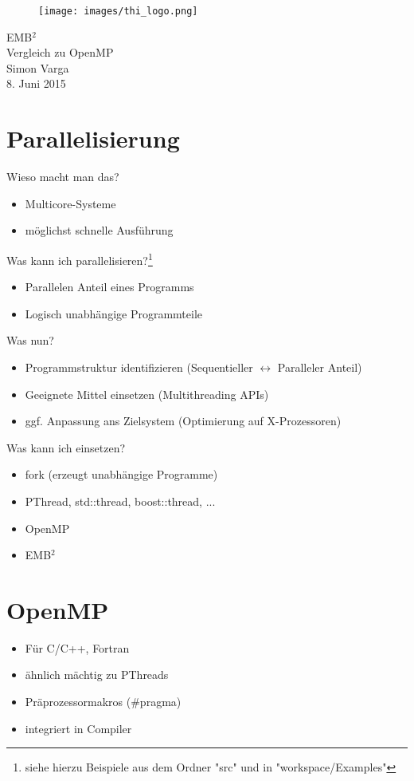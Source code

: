 \documentclass[a4paper,11pt,DIV=11]{article} %
\begin{document}
\begin{titlepage}
	\begin{figure}[h!]
	\centering
		\texttt{[image: images/thi\_logo.png]}
	\end{figure}
	
	\begin{center}
		\LARGE EMB$ ^2$\\ \large Vergleich zu OpenMP \\
		\vspace{1cm}
		\normalsize Simon Varga\\
		\normalsize 8. Juni 2015
	\end{center}
\end{titlepage}


\section{Parallelisierung}
Wieso macht man das?
\begin{itemize}
	\item Multicore-Systeme
	\item möglichst schnelle Ausführung
\end{itemize}
Was kann ich parallelisieren?\footnote{siehe hierzu Beispiele aus dem Ordner "src" und in "workspace/Examples"}
\begin{itemize}
	\item Parallelen Anteil eines Programms
	\item Logisch unabhängige Programmteile
\end{itemize}
Was nun?
\begin{itemize}
	\item Programmstruktur identifizieren (Sequentieller $\leftrightarrow$ Paralleler Anteil)
	\item Geeignete Mittel einsetzen (Multithreading APIs)
	\item ggf. Anpassung ans Zielsystem (Optimierung auf X-Prozessoren)
\end{itemize}
Was kann ich einsetzen?
\begin{itemize}
	\item fork (erzeugt unabhängige Programme)
	\item PThread, std::thread, boost::thread, ...
	\item OpenMP
	\item EMB$ ^2$
\end{itemize}

\section{OpenMP}
\begin{itemize}
	\item Für C/C++, Fortran
	\item ähnlich mächtig zu PThreads 
	\item Präprozessormakros (\#pragma)
	\item integriert in Compiler
\end{itemize}
\end{document}
